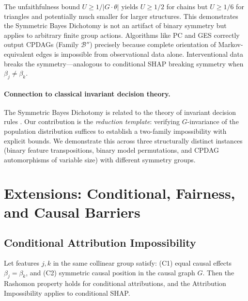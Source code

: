 \documentclass{jmlr}
\begin{document}
The unfaithfulness bound $U \geq 1/|G \cdot \theta|$ yields $U \geq 1/2$ for chains but $U \geq 1/6$ for triangles and potentially much smaller for larger structures. This demonstrates the Symmetric Bayes Dichotomy is not an artifact of binary symmetry but applies to arbitrary finite group actions. Algorithms like PC and GES correctly output CPDAGs (Family $\mathcal{B}''$) precisely because complete orientation of Markov-equivalent edges is impossible from observational data alone. Interventional data breaks the symmetry---analogous to conditional SHAP breaking symmetry when $\beta_j \neq \beta_k$.

\paragraph{Connection to classical invariant decision theory.}
The Symmetric Bayes Dichotomy is related to the theory of invariant decision rules \citep{lehmann2005testing}. Our contribution is the \emph{reduction template}: verifying $G$-invariance of the population distribution suffices to establish a two-family impossibility with explicit bounds. We demonstrate this across three structurally distinct instances (binary feature transpositions, binary model permutations, and CPDAG automorphisms of variable size) with different symmetry groups.


\section{Extensions: Conditional, Fairness, and Causal Barriers}
\label{sec:extensions}

\subsection{Conditional Attribution Impossibility}
\label{sec:conditional}

\begin{theorem}
\label{thm:conditional-impossibility}
Let features $j, k$ in the same collinear group satisfy: (C1) equal causal effects $\beta_j = \beta_k$, and (C2) symmetric causal position in the causal graph $G$. Then the Rashomon property holds for conditional attributions, and the Attribution Impossibility applies to conditional SHAP.
\end{theorem}
\end{document}
